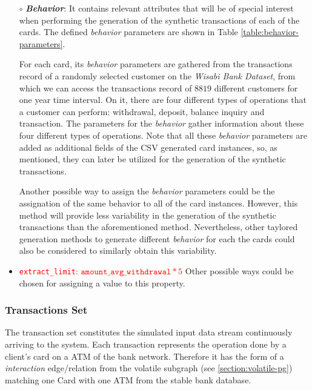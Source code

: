 \begin{itemize}
\item[$\circ$]\textbf{\emph{Behavior}}: It contains relevant attributes that will be of special interest when performing the 
generation of the synthetic transactions of each of the cards. The defined \emph{behavior}
parameters are shown in Table \ref{table:behavior-parameters}. 



For each card, its \emph{behavior} parameters are gathered from the transactions record of a randomly selected customer on the \emph{Wisabi Bank Dataset}, from which we can access the transactions record of $8819$ different customers for one year time interval. On it, there are four different types of operations that a customer can perform: withdrawal, deposit, balance inquiry and transaction. The parameters for the \emph{behavior} gather information about these four different types of operations. Note that all these \emph{behavior} parameters are added as additional fields of the CSV generated card instances, so, as mentioned, they can later be utilized for the generation of the synthetic
transactions.

Another possible way to assign the \emph{behavior} parameters could be the assignation
of the same behavior to all of the card instances. However, this method will provide less variability in
the generation of the synthetic transactions than the aforementioned method. 
Nevertheless, other taylored generation methods to generate different \emph{behavior} for 
each the cards could also be considered to similarly obtain this
variability.

\item \textcolor{red}{\texttt{extract\_limit}: $\texttt{amount\_avg\_withdrawal} * 5$} Other possible ways could be chosen for assigning a value to this property.
\end{itemize}

\subsubsection{Transactions Set}

The transaction set constitutes the simulated input data stream continuously arriving to the system. Each transaction represents the operation done by a client's card on a ATM of the bank network. Therefore it has the form of a \emph{interaction} edge/relation from the volatile subgraph (see \ref{section:volatile-pg}) matching one Card with one ATM from the stable bank database.

